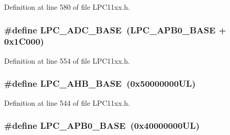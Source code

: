 Definition at line 580 of file L\+P\+C11xx.\+h.

\subsubsection[{\texorpdfstring{L\+P\+C\+\_\+\+A\+D\+C\+\_\+\+B\+A\+SE}{LPC_ADC_BASE}}]{\setlength{\rightskip}{0pt plus 5cm}\#define L\+P\+C\+\_\+\+A\+D\+C\+\_\+\+B\+A\+SE~({\bf L\+P\+C\+\_\+\+A\+P\+B0\+\_\+\+B\+A\+SE} + 0x1\+C000)}\hypertarget{group___l_p_c11xx___definitions_ga2396e0d0c565e4c1c3b2fc593bd6c37f}{}\label{group___l_p_c11xx___definitions_ga2396e0d0c565e4c1c3b2fc593bd6c37f}


Definition at line 554 of file L\+P\+C11xx.\+h.

\subsubsection[{\texorpdfstring{L\+P\+C\+\_\+\+A\+H\+B\+\_\+\+B\+A\+SE}{LPC_AHB_BASE}}]{\setlength{\rightskip}{0pt plus 5cm}\#define L\+P\+C\+\_\+\+A\+H\+B\+\_\+\+B\+A\+SE~(0x50000000\+U\+L)}\hypertarget{group___l_p_c11xx___definitions_ga8e0d25ffe3428ed27f963e83089046a8}{}\label{group___l_p_c11xx___definitions_ga8e0d25ffe3428ed27f963e83089046a8}


Definition at line 544 of file L\+P\+C11xx.\+h.

\subsubsection[{\texorpdfstring{L\+P\+C\+\_\+\+A\+P\+B0\+\_\+\+B\+A\+SE}{LPC_APB0_BASE}}]{\setlength{\rightskip}{0pt plus 5cm}\#define L\+P\+C\+\_\+\+A\+P\+B0\+\_\+\+B\+A\+SE~(0x40000000\+U\+L)}\hypertarget{group___l_p_c11xx___definitions_ga55cab996c3594a0f4cc459ec8e10daea}{}\label{group___l_p_c11xx___definitions_ga55cab996c3594a0f4cc459ec8e10daea}


